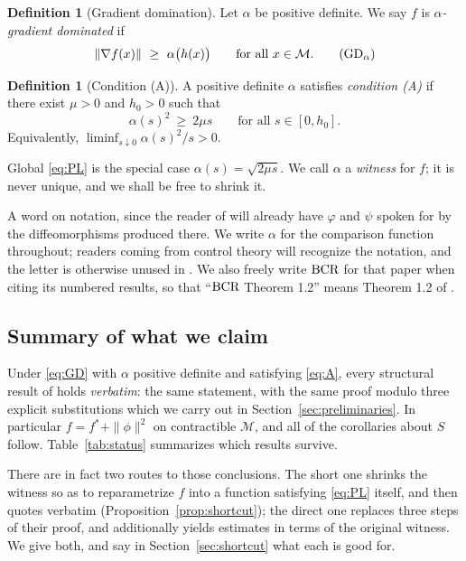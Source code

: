 \documentclass[11pt]{article}
\theoremstyle{plain}
\theoremstyle{definition}
\newtheorem{defn}[thm]{Definition}
\theoremstyle{remark}
\newcommand{\M}{\mathcal{M}}
\newcommand{\bcr}{\textup{BCR}}
\begin{document}
\begin{defn}[Gradient domination]\label{def:GD}
Let $\alpha$ be positive definite. We say $f$ is \emph{$\alpha$-gradient
dominated} if
\begin{equation}
  \|\nabla f(x)\| \ \ge\ \alpha\bigl(h(x)\bigr) \qquad \text{for all } x \in \M .
  \tag{$\mathrm{GD}_\alpha$}\label{eq:GD}
\end{equation}
\end{defn}

\begin{defn}[Condition (A)]\label{def:A}
A positive definite $\alpha$ satisfies \emph{condition {\rm(A)}} if there exist
$\mu>0$ and $h_0>0$ such that
\begin{equation}
  \alpha(s)^2 \ \ge\ 2\mu s \qquad \text{for all } s \in [0,h_0] .
  \tag{A}\label{eq:A}
\end{equation}
Equivalently, $\liminf_{s\downarrow 0} \alpha(s)^2/s > 0$.
\end{defn}

Global \eqref{eq:PL} is the special case $\alpha(s)=\sqrt{2\mu s}$. We call
$\alpha$ a \emph{witness} for $f$; it is never unique, and we shall be free to
shrink it.

A word on notation, since the reader of \cite{BCR2026} will already have
$\varphi$ and $\psi$ spoken for by the diffeomorphisms produced there. We write
$\alpha$ for the comparison function throughout; readers coming from control
theory will recognize the notation, and the letter is otherwise unused in
\cite{BCR2026}. We also freely write $\bcr$ for that paper when citing its
numbered results, so that ``$\bcr$ Theorem 1.2'' means Theorem 1.2 of
\cite{BCR2026}.

\subsection{Summary of what we claim}

Under \eqref{eq:GD} with $\alpha$ positive definite and satisfying \eqref{eq:A},
every structural result of \cite{BCR2026} holds \emph{verbatim}: the same
statement, with the same proof modulo three explicit substitutions which we carry
out in Section~\ref{sec:preliminaries}. In particular $f = f^* + \|\phi\|^2$ on
contractible $\M$, and all of the corollaries about $S$ follow. Table~\ref{tab:status}
summarizes which results survive.

There are in fact two routes to those conclusions. The short one shrinks the
witness so as to reparametrize $f$ into a function satisfying \eqref{eq:PL}
itself, and
then quotes \cite{BCR2026} verbatim (Proposition~\ref{prop:shortcut}); the direct
one replaces three steps of their proof, and additionally yields estimates in terms
of the original witness. We give both, and say in Section~\ref{sec:shortcut} what
each is good for.
\end{document}
